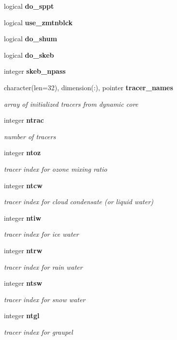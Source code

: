 \begin{DoxyCompactItemize}
logical \textbf{ do\+\_\+sppt}
\item 
logical \textbf{ use\+\_\+zmtnblck}
\item 
logical \textbf{ do\+\_\+shum}
\item 
logical \textbf{ do\+\_\+skeb}
\item 
integer \textbf{ skeb\+\_\+npass}
\item 
character(len=32), dimension(\+:), pointer \textbf{ tracer\+\_\+names}
\begin{DoxyCompactList}\small\item\em array of initialized tracers from dynamic core \end{DoxyCompactList}\item 
integer \textbf{ ntrac}
\begin{DoxyCompactList}\small\item\em number of tracers \end{DoxyCompactList}\item 
integer \textbf{ ntoz}
\begin{DoxyCompactList}\small\item\em tracer index for ozone mixing ratio \end{DoxyCompactList}\item 
integer \textbf{ ntcw}
\begin{DoxyCompactList}\small\item\em tracer index for cloud condensate (or liquid water) \end{DoxyCompactList}\item 
integer \textbf{ ntiw}
\begin{DoxyCompactList}\small\item\em tracer index for ice water \end{DoxyCompactList}\item 
integer \textbf{ ntrw}
\begin{DoxyCompactList}\small\item\em tracer index for rain water \end{DoxyCompactList}\item 
integer \textbf{ ntsw}
\begin{DoxyCompactList}\small\item\em tracer index for snow water \end{DoxyCompactList}\item 
integer \textbf{ ntgl}
\begin{DoxyCompactList}\small\item\em tracer index for graupel \end{DoxyCompactList}\item 

\end{DoxyCompactItemize}
